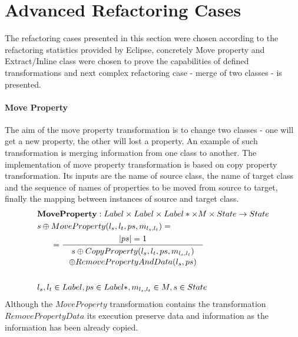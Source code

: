 \documentclass[11pt]{article}
\begin{document}

\section{Advanced Refactoring Cases}
The refactoring cases presented in this section were chosen according to the refactoring statistics provided by Eclipse, concretely Move property and Extract/Inline class were chosen to prove the capabilities of defined transformations and next complex refactoring case - merge of two classes - is presented.
\paragraph{Move Property}
The aim of the move property transformation is to change two classes - one will get a new property, the other will lost a property. An example of such transformation is merging information from one class to another. The implementation of move property transformation is based on copy property transformation. Its inputs are the name of source class, the name of target class and the sequence of names of properties to be moved from source to target, finally the mapping between instances of source and target class.
\begin{align*}
&	\mathbf{MoveProperty} : Label \times Label \times Label* \times M \times State \rightarrow State \\
&	s \oplus MoveProperty(l_s, l_t, ps, m_{l_s, l_t}) = \\
& \;\;\;\;\;\; = 	\inference{|ps| = 1 }{\begin{gathered} s \oplus CopyProperty(l_s, l_t, ps, m_{l_s, l_t}) \\ \oplus RemovePropertyAndData(l_s, ps)
\end{gathered}}
	\\ \\
&	l_s, l_t \in Label, ps \in Label*,  m_{l_s, l_t} \in M, s \in State
\end{align*}
Although the $MoveProperty$ transformation contains the transformation $RemovePropertyData$ its execution preserve data and information as the information has been already copied. 
\end{document}
